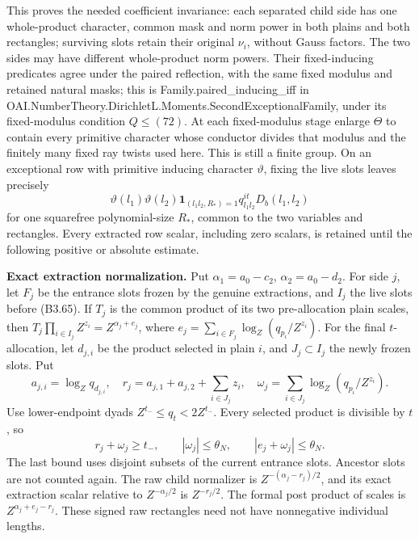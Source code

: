 \documentclass[11pt,a4paper]{article}
\newcommand{\sourcecode}[1]{{\small\ttfamily #1}}
\begin{document}
This proves the needed coefficient invariance: each separated child side
has one whole-product character, common mask and norm power in both
plains and both rectangles; surviving slots retain their original
\(\nu_i\), without Gauss factors. The two sides may have different
whole-product norm powers. Their fixed-inducing predicates agree under
the paired reflection, with the same fixed modulus and retained natural
masks; this is \sourcecode{Family.\allowbreak{}paired\_\allowbreak{}inducing\_\allowbreak{}iff} in
\sourcecode{OAI.\allowbreak{}Number\allowbreak{}Theory.\allowbreak{}Dirichlet\allowbreak{}L.\allowbreak{}Moments.\allowbreak{}Second\allowbreak{}Exceptional\allowbreak{}Family},
under its fixed-modulus condition \(Q\le(72)\). At each fixed-modulus
stage enlarge \(\Theta\) to contain every primitive character whose
conductor divides that modulus and the finitely many fixed ray twists
used here. This is still a finite group. On an exceptional row with
primitive inducing character \(\vartheta\), fixing the live slots leaves
precisely \[
\vartheta(l_1)\vartheta(l_2)\mathbf1_{(l_1l_2,R_*)=1}
 q_{l_1l_2}^{it}D_b(l_1,l_2)
\tag{B3.66}
\] for one squarefree polynomial-size \(R_*\), common to the two
variables and rectangles. Every extracted row scalar, including zero
scalars, is retained until the following positive or absolute estimate.

\textbf{Exact extraction normalization.} Put \(\alpha_1=a_0-c_2\),
\(\alpha_2=a_0-d_2\). For side \(j\), let \(F_j\) be the entrance slots
frozen by the genuine extractions, and \(I_j\) the live slots before
(B3.65). If \(T_j\) is the common product of its two pre-allocation
plain scales, then \(T_j\prod_{i\in I_j}Z^{z_i}=Z^{\alpha_j+e_j}\),
where \(e_j=\sum_{i\in F_j}\log_Z(q_{p_i}/Z^{z_i})\). For the final
\(t\)-allocation, let \(d_{j,\allowbreak{}i}\) be the product selected in plain
\(i\), and \(J_j\subset I_j\) the newly frozen slots. Put \[
a_{j,i}=\log_Zq_{d_{j,i}},\quad
r_j=a_{j,1}+a_{j,2}+\sum_{i\in J_j}z_i,\quad
\omega_j=\sum_{i\in J_j}\log_Z(q_{p_i}/Z^{z_i}).
\] Use lower-endpoint dyads \(Z^{t_-}\le q_t<2Z^{t_-}\). Every selected
product is divisible by \(t\), so \[
r_j+\omega_j\ge t_-,\qquad |\omega_j|\le\theta_N,
\qquad |e_j+\omega_j|\le\theta_N.
\tag{B3.67}
\] The last bound uses disjoint subsets of the current entrance slots.
Ancestor slots are not counted again. The raw child normalizer is
\(Z^{-(\alpha_j-r_j)/2}\), and its exact extraction scalar relative to
\(Z^{-\alpha_j/2}\) is \(Z^{-r_j/2}\). The formal post product of scales
is \(Z^{\alpha_j+e_j-r_j}\). These signed raw rectangles need not have
nonnegative individual lengths.
\end{document}
